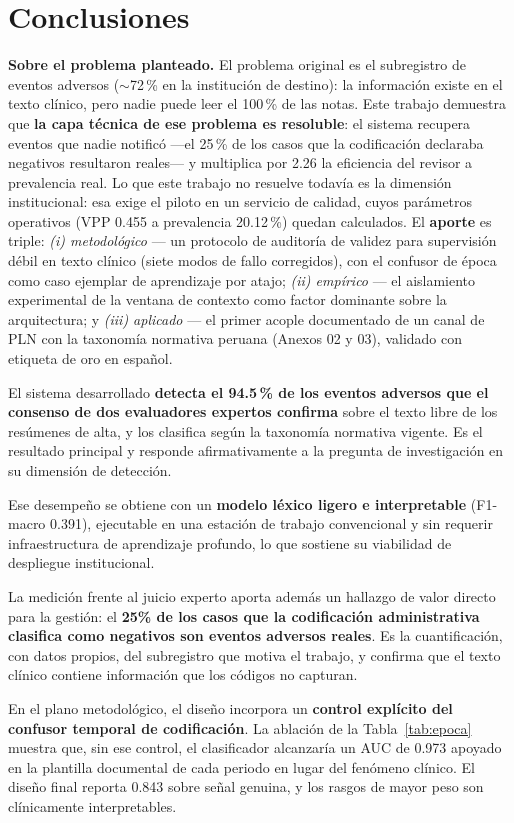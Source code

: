 \documentclass[conference]{IEEEtran}
\begin{document}
\section{Conclusiones}
\textbf{Sobre el problema planteado.} El problema original es el subregistro
de eventos adversos ($\sim$72\,\% en la institución de destino): la
información existe en el texto clínico, pero nadie puede leer el 100\,\% de
las notas. Este trabajo demuestra que \textbf{la capa técnica de ese problema
es resoluble}: el sistema recupera eventos que nadie notificó ---el 25\,\% de
los casos que la codificación declaraba negativos resultaron reales--- y
multiplica por 2.26 la eficiencia del revisor a prevalencia real. Lo que este
trabajo no resuelve todavía es la dimensión institucional: esa exige el
piloto en un servicio de calidad, cuyos parámetros operativos (VPP 0.455 a
prevalencia 20.12\,\%) quedan calculados. El \textbf{aporte} es triple:
\emph{(i) metodológico} --- un protocolo de auditoría de validez para
supervisión débil en texto clínico (siete modos de fallo corregidos), con el
confusor de época como caso ejemplar de aprendizaje por atajo;
\emph{(ii) empírico} --- el aislamiento experimental de la ventana de
contexto como factor dominante sobre la arquitectura; y
\emph{(iii) aplicado} --- el primer acople documentado de un canal de PLN con
la taxonomía normativa peruana (Anexos 02 y 03), validado con etiqueta de oro
en español.

El sistema desarrollado \textbf{detecta el
94.5\,\% de los eventos adversos que el consenso
de dos evaluadores expertos confirma} sobre el texto libre de los resúmenes de
alta, y los clasifica según la taxonomía normativa vigente. Es el resultado
principal y responde afirmativamente a la pregunta de investigación en su
dimensión de detección.

Ese desempeño se obtiene con un \textbf{modelo léxico ligero e interpretable}
(F1-macro 0.391), ejecutable en una estación
de trabajo convencional y sin requerir infraestructura de aprendizaje profundo,
lo que sostiene su viabilidad de despliegue institucional.

La medición frente al juicio experto aporta además un hallazgo de valor
directo para la gestión: el \textbf{25\% de los casos
que la codificación administrativa clasifica como negativos son eventos
adversos reales}. Es la cuantificación, con datos propios, del subregistro que
motiva el trabajo, y confirma que el texto clínico contiene información que los
códigos no capturan.

En el plano metodológico, el diseño incorpora un \textbf{control explícito del
confusor temporal de codificación}. La ablación de la Tabla~\ref{tab:epoca}
muestra que, sin ese control, el clasificador alcanzaría un AUC de 0.973
apoyado en la plantilla documental de cada periodo en lugar del fenómeno
clínico. El diseño final reporta 0.843 sobre señal genuina, y los
rasgos de mayor peso son clínicamente interpretables.
\end{document}
